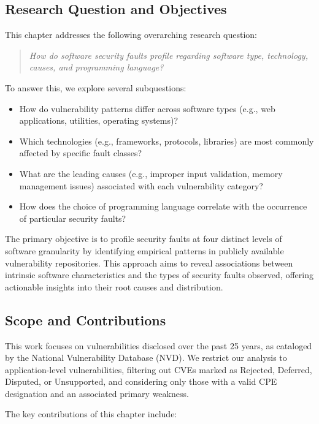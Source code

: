 \subsection{Research Question and Objectives}

This chapter addresses the following overarching research question:

\begin{quote}
\textit{How do software security faults profile regarding software type, technology, causes, and programming language?}
\end{quote}

To answer this, we explore several subquestions:

\begin{itemize}
    \item How do vulnerability patterns differ across software types (e.g., web applications, utilities, operating systems)?
    \item Which technologies (e.g., frameworks, protocols, libraries) are most commonly affected by specific fault classes?
    \item What are the leading causes (e.g., improper input validation, memory management issues) associated with each vulnerability category?
    \item How does the choice of programming language correlate with the occurrence of particular security faults?
\end{itemize}

The primary objective is to profile security faults at four distinct levels of software granularity by identifying empirical patterns in publicly available vulnerability repositories. This approach aims to reveal associations between intrinsic software characteristics and the types of security faults observed, offering actionable insights into their root causes and distribution.

\subsection{Scope and Contributions}

This work focuses on vulnerabilities disclosed over the past 25 years, as cataloged by the National Vulnerability Database (NVD). We restrict our analysis to application-level vulnerabilities, filtering out CVEs marked as Rejected, Deferred, Disputed, or Unsupported, and considering only those with a valid CPE designation and an associated primary weakness.

The key contributions of this chapter include:

